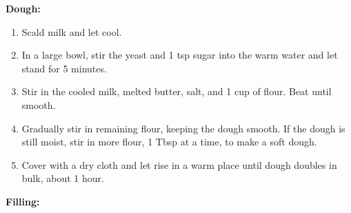 
\textbf{Dough:}

\begin{ingredients}
\end{ingredients}


\begin{recipe}
  \begin{enumerate}

  \item Scald milk and let cool.

  \item In a large bowl, stir the yeast and 1 tsp sugar into the warm
    water and let stand for 5 minutes.

  \item Stir in the cooled milk, melted butter, salt, and 1 cup of
    flour.  Beat until smooth.

  \item Gradually stir in remaining flour, keeping the dough smooth.
    If the dough is still moist, stir in more flour, 1 Tbsp at a time,
    to make a soft dough.

  \item Cover with a dry cloth and let rise in a warm place until
    dough doubles in bulk, about 1 hour.

  \end{enumerate}
\end{recipe}


\textbf{Filling:}

\begin{ingredients}
\end{ingredients}


